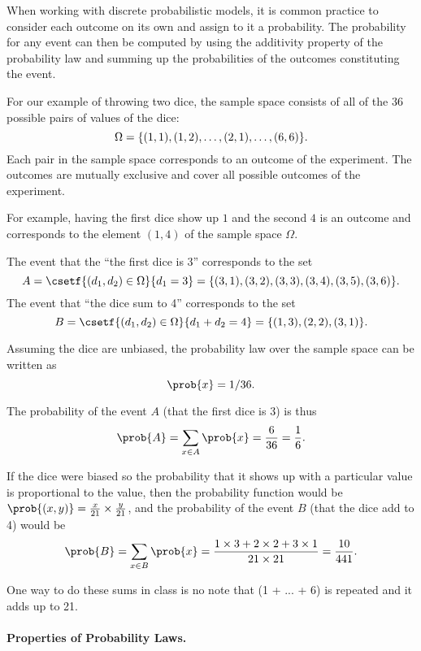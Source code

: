 {When working with discrete probabilistic models, it is common practice
to consider each outcome on its own and assign to it a probability.
%
The probability for any event can then be computed by using the
additivity  property of the probability law and summing up the
probabilities of the outcomes constituting the event.

\begin{example}
  For our example of throwing two dice, the sample space
  consists of all of the $36$ possible pairs of values of the dice:
\[
\Omega = \{(1,1),(1,2),\ldots,(2,1),\ldots,(6,6)\}.
\]
%
Each pair in the sample space corresponds to an outcome of the experiment.
%
The outcomes are mutually exclusive and cover all possible outcomes of
the experiment.


For example, having the first dice show up $1$ and the second $4$ is
an outcome and corresponds to  the element $(1,4)$ of the sample space $\Omega$.

The event that the ``the first dice is 3'' corresponds to the
set
\[
A = \csetf{(d_1,d_2) \in \Omega}{d_1 = 3} =
\{(3,1),(3,2),(3,3),(3,4),(3,5),(3,6)\}.
\]
The event that ``the dice sum to 4'' corresponds to the set
\[
B = \csetf{(d_1,d_2) \in \Omega}{d_1 + d_2 = 4} =
\{(1,3),(2,2),(3,1)\}.
\]

Assuming the dice are unbiased, the probability law over
the sample space can be written as 
\[
\prob{x} = 1/36.
\]

The probability of the event $A$ (that the first dice
is 3) is thus 
\[
\prob{A} = \sum_{x \in A} \prob{x} = \frac{6}{36} = \frac{1}{6}. 
\]

If the dice were biased so the probability that it shows up with a
particular value is proportional to the value, then the probability
function would be $\prob{(x,y)} = \frac{x}{21} \times \frac{y}{21}$,
and the probability of the event $B$ (that the dice add to 4) would be
\[
\prob{B} = \sum_{x \in B} \prob{x} = \frac{1 \times 3 + 2 \times 2
  + 3 \times 1}{21 \times 21} = \frac{10}{441}. 
\]

\begin{notesonly}
One way to do these sums in class is no note that (1 + ... + 6) is
repeated and it adds up to 21.
\end{notesonly}
\end{example}

\paragraph{Properties of Probability Laws.}

}
